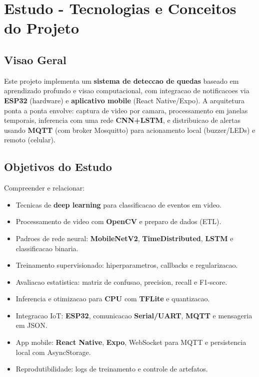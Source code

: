 %

\section{Estudo - Tecnologias e Conceitos do Projeto}

\subsection{Visao Geral}
Este projeto implementa um \textbf{sistema de deteccao de quedas} baseado em aprendizado profundo e visao computacional, com integracao de notificacoes via \textbf{ESP32} (hardware) e \textbf{aplicativo mobile} (React Native/Expo). A arquitetura ponta a ponta envolve:
captura de video por camara, processamento em janelas temporais, inferencia com uma rede \textbf{CNN+LSTM}, e distribuicao de alertas usando \textbf{MQTT} (com broker Mosquitto) para acionamento local (buzzer/LEDs) e remoto (celular).

\subsection{Objetivos do Estudo}
Compreender e relacionar:
\begin{itemize}
  \item Tecnicas de \textbf{deep learning} para classificacao de eventos em video.
  \item Processamento de video com \textbf{OpenCV} e preparo de dados (ETL).
  \item Padroes de rede neural: \textbf{MobileNetV2}, \textbf{TimeDistributed}, \textbf{LSTM} e classificacao binaria.
  \item Treinamento supervisionado: hiperparametros, callbacks e regularizacao.
  \item Avaliacao estatistica: matriz de confusao, precision, recall e F1-score.
  \item Inferencia e otimizacao para \textbf{CPU} com \textbf{TFLite} e quantizacao.
  \item Integracao IoT: \textbf{ESP32}, comunicacao \textbf{Serial/UART}, \textbf{MQTT} e mensageria em JSON.
  \item App mobile: \textbf{React Native}, \textbf{Expo}, WebSocket para MQTT e persistencia local com AsyncStorage.
  \item Reprodutibilidade: logs de treinamento e controle de artefatos.
\end{itemize}


